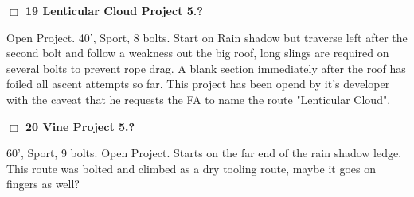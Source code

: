 \begin{multicols}{2}
\needspace{2em}
\label{rt:Lenticular Cloud Project}
\colorbox{black!20}{
\parbox{0.95\linewidth}{
\hspace{-1ex}\textbf{$\Box$
19 Lenticular Cloud Project 5.?  
}}}
\begin{adjustwidth}{1.3em}{}			

Open Project. 40', Sport, 8 bolts. Start on Rain shadow but traverse left after the second bolt and follow a weakness out the big roof, long slings are required on several bolts to prevent rope drag. A blank section immediately after the roof has foiled all ascent attempts so far. This project has been opend by it's developer with the caveat that he requests the FA to name the route "Lenticular Cloud".
\end{adjustwidth}




\needspace{2em}
\label{rt:Vine Project}
\colorbox{black!20}{
\parbox{0.95\linewidth}{
\hspace{-1ex}\textbf{$\Box$
20 Vine Project 5.?  
}}}
\begin{adjustwidth}{1.3em}{}			

60', Sport, 9 bolts. Open Project. Starts on the far end of the rain shadow ledge. This route was bolted and climbed as a dry tooling route, maybe it goes on fingers as well?
\end{adjustwidth}




	\end{multicols}
\label{tp:Garden Cliff Castle Black Area}
  \begin{landscape}
	
  \end{landscape}

